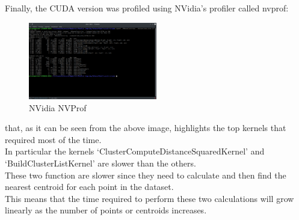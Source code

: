 \documentclass[10pt,twocolumn,letterpaper]{article}
\begin{document}
Finally, the CUDA version was profiled using NVidia's profiler called nvprof:\\
\begin{figure}[H]
\centering
\includegraphics[width=0.5\textwidth]{Cuda_NVProf}
\caption{NVidia NVProf}
\end{figure}
that, as it can be seen from the above image, highlights the top kernels that required most of the time.\\
In particular the kernels `ClusterComputeDistanceSquaredKernel' and `BuildClusterListKernel' are slower than the others.\\
These two function are slower since they need to calculate and then find the nearest centroid for each point in the dataset.\\
This means that the time required to perform these two calculations will grow linearly as the number of points or centroids increases.
\end{document}
